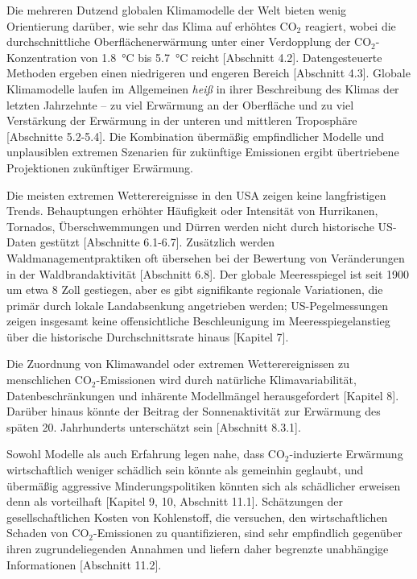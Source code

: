 \documentclass[12pt,paper=a4,DIV=12,parskip=never,chapterprefix=false,headings=standardclasses]{scrreprt}
\numberwithin{figure}{chapter}
\begin{document}
Die mehreren Dutzend globalen Klimamodelle der Welt bieten wenig Orientierung darüber, wie sehr das Klima auf erhöhtes CO$_2$ reagiert, wobei die durchschnittliche Oberflächenerwärmung unter einer Verdopplung der CO$_2$-Konzentration von \SI{1.8}{\celsius} bis \SI{5.7}{\celsius} reicht [Abschnitt 4.2]. Datengesteuerte Methoden ergeben einen niedrigeren und engeren Bereich [Abschnitt 4.3]. Globale Klimamodelle laufen im Allgemeinen \emph{heiß} in ihrer Beschreibung des Klimas der letzten Jahrzehnte -- zu viel Erwärmung an der Oberfläche und zu viel Verstärkung der Erwärmung in der unteren und mittleren Troposphäre [Abschnitte 5.2-5.4]. Die Kombination übermäßig empfindlicher Modelle und unplausiblen extremen Szenarien für zukünftige Emissionen ergibt übertriebene Projektionen zukünftiger Erwärmung.

Die meisten extremen Wetterereignisse in den USA zeigen keine langfristigen Trends. Behauptungen erhöhter Häufigkeit oder Intensität von Hurrikanen, Tornados, Überschwemmungen und Dürren werden nicht durch historische US-Daten gestützt [Abschnitte 6.1-6.7]. Zusätzlich werden Waldmanagementpraktiken oft übersehen bei der Bewertung von Veränderungen in der Waldbrandaktivität [Abschnitt 6.8]. Der globale Meeresspiegel ist seit 1900 um etwa 8 Zoll gestiegen, aber es gibt signifikante regionale Variationen, die primär durch lokale Landabsenkung angetrieben werden; US-Pegelmessungen zeigen insgesamt keine offensichtliche Beschleunigung im Meeresspiegelanstieg über die historische Durchschnittsrate hinaus [Kapitel 7].

Die Zuordnung von Klimawandel oder extremen Wetterereignissen zu menschlichen CO$_2$-Emissionen wird durch natürliche Klimavariabilität, Datenbeschränkungen und inhärente Modellmängel herausgefordert [Kapitel 8]. Darüber hinaus könnte der Beitrag der Sonnenaktivität zur Erwärmung des späten 20. Jahrhunderts unterschätzt sein [Abschnitt 8.3.1].

Sowohl Modelle als auch Erfahrung legen nahe, dass CO$_2$-induzierte Erwärmung wirtschaftlich weniger schädlich sein könnte als gemeinhin geglaubt, und übermäßig aggressive Minderungspolitiken könnten sich als schädlicher erweisen denn als vorteilhaft [Kapitel 9, 10, Abschnitt 11.1]. Schätzungen der gesellschaftlichen Kosten von Kohlenstoff, die versuchen, den wirtschaftlichen Schaden von CO$_2$-Emissionen zu quantifizieren, sind sehr empfindlich gegenüber ihren zugrundeliegenden Annahmen und liefern daher begrenzte unabhängige Informationen [Abschnitt 11.2].
\end{document}
